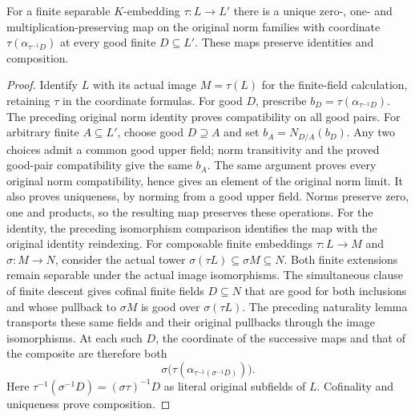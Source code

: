 \begin{lemma}
\label{fw:covariant-norm-family-map}
\leanok
For a finite separable $K$-embedding $\tau:L\to L'$ there is a unique
zero-, one- and multiplication-preserving map on the original norm
families with coordinate $\tau(\alpha_{\tau^{-1}D})$ at every good
finite $D\subseteq L'$. These maps preserve identities and composition.
\end{lemma}
\begin{proof}
Identify $L$ with its actual image $M=\tau(L)$ for the finite-field
calculation, retaining $\tau$ in the coordinate formulas.
For good $D$, prescribe $b_D=\tau(\alpha_{\tau^{-1}D})$.
The preceding original norm identity proves compatibility on all good
pairs. For arbitrary finite $A\subseteq L'$, choose good $D\supseteq A$
and set $b_A=N_{D/A}(b_D)$.
Any two choices admit a common good upper field; norm transitivity and
the proved good-pair compatibility give the same $b_A$.
The same argument proves every original norm compatibility, hence gives
an element of the original norm limit. It also proves uniqueness, by
norming from a good upper field. Norms preserve zero, one and products,
so the resulting map preserves these operations.
For the identity, the preceding isomorphism comparison identifies the
map with the original identity reindexing.
For composable finite embeddings $\tau:L\to M$ and $\sigma:M\to N$,
consider the actual tower $\sigma(\tau L)\subseteq\sigma M\subseteq N$.
Both finite extensions remain separable under the actual image
isomorphisms. The simultaneous clause of finite descent gives cofinal
finite fields $D\subseteq N$ that are good for both inclusions and
whose pullback to $\sigma M$ is good over $\sigma(\tau L)$.
The preceding naturality lemma transports these same fields and their
original pullbacks through the image isomorphisms.
At each such $D$, the coordinate of the successive maps and that of
the composite are therefore both
\[
 \sigma\bigl(\tau(\alpha_{\tau^{-1}(\sigma^{-1}D)})\bigr).
\]
Here $\tau^{-1}(\sigma^{-1}D)=(\sigma\tau)^{-1}D$ as literal
original subfields of $L$. Cofinality and uniqueness prove composition.
\end{proof}

